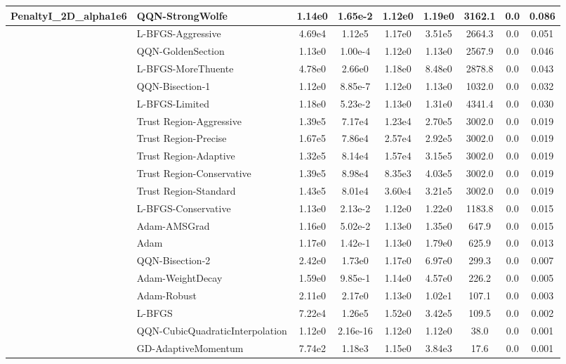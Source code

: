 \documentclass{article}
\begin{document}
\begin{longtable}{|l|l|c|c|c|c|c|c|c|}
PenaltyI\_2D\_alpha1e6 & \textbf{QQN-StrongWolfe} & 1.14e0 & 1.65e-2 & 1.12e0 & 1.19e0 & 3162.1 & 0.0 & 0.086 \\
\hline
 & L-BFGS-Aggressive & 4.69e4 & 1.12e5 & 1.17e0 & 3.51e5 & 2664.3 & 0.0 & 0.051 \\
\hline
 & QQN-GoldenSection & 1.13e0 & 1.00e-4 & 1.12e0 & 1.13e0 & 2567.9 & 0.0 & 0.046 \\
\hline
 & L-BFGS-MoreThuente & 4.78e0 & 2.66e0 & 1.18e0 & 8.48e0 & 2878.8 & 0.0 & 0.043 \\
\hline
 & QQN-Bisection-1 & 1.12e0 & 8.85e-7 & 1.12e0 & 1.13e0 & 1032.0 & 0.0 & 0.032 \\
\hline
 & L-BFGS-Limited & 1.18e0 & 5.23e-2 & 1.13e0 & 1.31e0 & 4341.4 & 0.0 & 0.030 \\
\hline
 & Trust Region-Aggressive & 1.39e5 & 7.17e4 & 1.23e4 & 2.70e5 & 3002.0 & 0.0 & 0.019 \\
\hline
 & Trust Region-Precise & 1.67e5 & 7.86e4 & 2.57e4 & 2.92e5 & 3002.0 & 0.0 & 0.019 \\
\hline
 & Trust Region-Adaptive & 1.32e5 & 8.14e4 & 1.57e4 & 3.15e5 & 3002.0 & 0.0 & 0.019 \\
\hline
 & Trust Region-Conservative & 1.39e5 & 8.98e4 & 8.35e3 & 4.03e5 & 3002.0 & 0.0 & 0.019 \\
\hline
 & Trust Region-Standard & 1.43e5 & 8.01e4 & 3.60e4 & 3.21e5 & 3002.0 & 0.0 & 0.019 \\
\hline
 & L-BFGS-Conservative & 1.13e0 & 2.13e-2 & 1.12e0 & 1.22e0 & 1183.8 & 0.0 & 0.015 \\
\hline
 & Adam-AMSGrad & 1.16e0 & 5.02e-2 & 1.13e0 & 1.35e0 & 647.9 & 0.0 & 0.015 \\
\hline
 & Adam & 1.17e0 & 1.42e-1 & 1.13e0 & 1.79e0 & 625.9 & 0.0 & 0.013 \\
\hline
 & QQN-Bisection-2 & 2.42e0 & 1.73e0 & 1.17e0 & 6.97e0 & 299.3 & 0.0 & 0.007 \\
\hline
 & Adam-WeightDecay & 1.59e0 & 9.85e-1 & 1.14e0 & 4.57e0 & 226.2 & 0.0 & 0.005 \\
\hline
 & Adam-Robust & 2.11e0 & 2.17e0 & 1.13e0 & 1.02e1 & 107.1 & 0.0 & 0.003 \\
\hline
 & L-BFGS & 7.22e4 & 1.26e5 & 1.52e0 & 3.42e5 & 109.5 & 0.0 & 0.002 \\
\hline
 & QQN-CubicQuadraticInterpolation & 1.12e0 & 2.16e-16 & 1.12e0 & 1.12e0 & 38.0 & 0.0 & 0.001 \\
\hline
 & GD-AdaptiveMomentum & 7.74e2 & 1.18e3 & 1.15e0 & 3.84e3 & 17.6 & 0.0 & 0.001 \\

\end{longtable}
\end{document}
